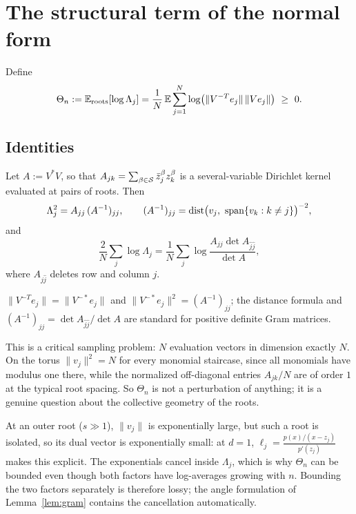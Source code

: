 \section{The structural term of the normal form}\label{sec:structural}

Define
\[
  \Theta_n := \Eroots[\log\Lambda_j]
  = \frac1N\,\E\sum_{j=1}^N\log\bigl(\|V^{-T}e_j\|\,\|Ve_j\|\bigr) \ \ge\ 0.
\]

\subsection{Identities}

\begin{lemma}\label{lem:gram}
  Let $A := V^*V$, so that $A_{jk} = \sum_{\beta\in\mathcal{S}}\bar z_j^\beta z_k^\beta$ is a
  several-variable Dirichlet kernel evaluated at pairs of roots. Then
  \[
    \Lambda_j^2 = A_{jj}\,(A^{-1})_{jj}, \qquad
    (A^{-1})_{jj} = \operatorname{dist}\bigl(v_j,\ \operatorname{span}\{v_k:k\ne j\}\bigr)^{-2},
  \]
  and
  \[
    \frac2N\sum_j\log\Lambda_j
    = \frac1N\sum_j\log\frac{A_{jj}\det A_{\hat j\hat j}}{\det A},
  \]
  where $A_{\hat j\hat j}$ deletes row and column $j$.
\end{lemma}

\proof
$\|V^{-T}e_j\| = \|V^{-*}e_j\|$ and $\|V^{-*}e_j\|^2 = (A^{-1})_{jj}$; the distance formula
and $(A^{-1})_{jj} = \det A_{\hat j\hat j}/\det A$ are standard for positive definite Gram
matrices.
\endproof

\begin{remark}\label{rem:criticalsampling}
  This is a critical sampling problem: $N$ evaluation vectors in dimension exactly $N$. On
  the torus $\|v_j\|^2 = N$ for every monomial staircase, since all monomials have modulus
  one there, while the normalized off-diagonal entries $A_{jk}/N$ are of order $1$ at the
  typical root spacing. So $\Theta_n$ is not a perturbation of anything; it is a genuine
  question about the collective geometry of the roots.
\end{remark}

\begin{remark}\label{rem:dualvector}
  At an outer root ($s\gg1$), $\|v_j\|$ is exponentially large, but such a root is isolated,
  so its dual vector is exponentially small: at $d=1$,
  $\ell_j = \frac{p(x)/(x-z_j)}{p'(z_j)}$ makes this explicit. The exponentials cancel
  inside $\Lambda_j$, which is why $\Theta_n$ can be bounded even though both factors have
  log-averages growing with $n$. Bounding the two factors separately is therefore lossy; the
  angle formulation of Lemma~\ref{lem:gram} contains the cancellation automatically.
\end{remark}

